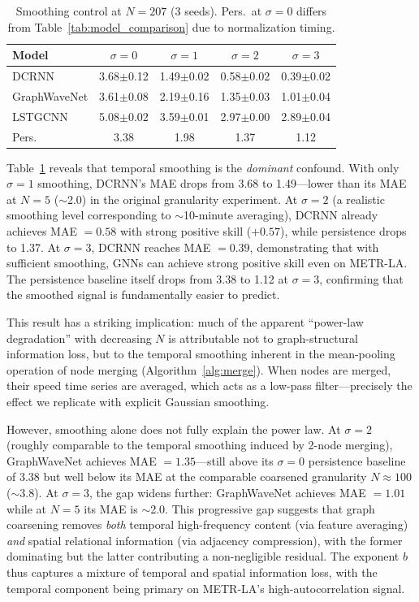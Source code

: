 \documentclass[letterpaper]{article}
\begin{document}
\begin{table}[t]
\small
\centering
\caption{Smoothing control at $N{=}207$ (3 seeds). Pers.\ at $\sigma{=}0$ differs from Table~\ref{tab:model_comparison} due to normalization timing.}
\label{tab:smoothing}
\begin{tabular}{lcccc}
\toprule
Model & $\sigma{=}0$ & $\sigma{=}1$ & $\sigma{=}2$ & $\sigma{=}3$ \\
\midrule
DCRNN        & 3.68$\pm$0.12 & 1.49$\pm$0.02 & 0.58$\pm$0.02 & 0.39$\pm$0.02 \\
GraphWaveNet & 3.61$\pm$0.08 & 2.19$\pm$0.16 & 1.35$\pm$0.03 & 1.01$\pm$0.04 \\
LSTGCNN      & 5.08$\pm$0.02 & 3.59$\pm$0.01 & 2.97$\pm$0.00 & 2.89$\pm$0.04 \\
\midrule
Pers.\ & 3.38 & 1.98 & 1.37 & 1.12 \\
\bottomrule
\end{tabular}
\end{table}

Table~\ref{tab:smoothing} reveals that temporal smoothing is the \textit{dominant} confound. With only $\sigma = 1$ smoothing, DCRNN's MAE drops from 3.68 to 1.49---lower than its MAE at $N = 5$ ($\sim$2.0) in the original granularity experiment. At $\sigma = 2$ (a realistic smoothing level corresponding to $\sim$10-minute averaging), DCRNN already achieves MAE $= 0.58$ with strong positive skill ($+0.57$), while persistence drops to 1.37. At $\sigma = 3$, DCRNN reaches MAE $= 0.39$, demonstrating that with sufficient smoothing, GNNs can achieve strong positive skill even on METR-LA. The persistence baseline itself drops from 3.38 to 1.12 at $\sigma = 3$, confirming that the smoothed signal is fundamentally easier to predict.

This result has a striking implication: much of the apparent ``power-law degradation'' with decreasing $N$ is attributable not to graph-structural information loss, but to the temporal smoothing inherent in the mean-pooling operation of node merging (Algorithm~\ref{alg:merge}). When nodes are merged, their speed time series are averaged, which acts as a low-pass filter---precisely the effect we replicate with explicit Gaussian smoothing.

However, smoothing alone does not fully explain the power law. At $\sigma = 2$ (roughly comparable to the temporal smoothing induced by 2-node merging), GraphWaveNet achieves MAE $= 1.35$---still above its $\sigma=0$ persistence baseline of 3.38 but well below its MAE at the comparable coarsened granularity $N \approx 100$ ($\sim$3.8). At $\sigma = 3$, the gap widens further: GraphWaveNet achieves MAE $= 1.01$ while at $N = 5$ its MAE is $\sim$2.0. This progressive gap suggests that graph coarsening removes \textit{both} temporal high-frequency content (via feature averaging) \textit{and} spatial relational information (via adjacency compression), with the former dominating but the latter contributing a non-negligible residual. The exponent $b$ thus captures a mixture of temporal and spatial information loss, with the temporal component being primary on METR-LA's high-autocorrelation signal.
\end{document}
